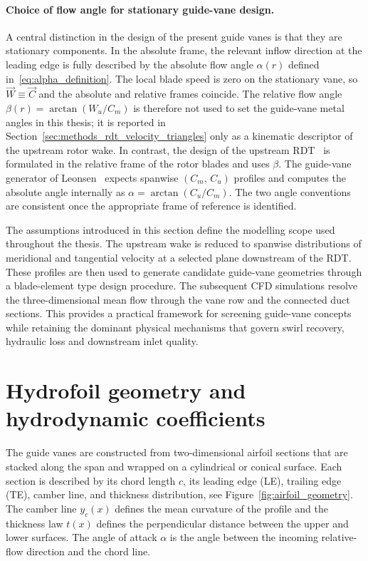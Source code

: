 \paragraph{Choice of flow angle for stationary guide-vane design.}
A central distinction in the design of the present guide vanes is that they are stationary components. In the absolute frame, the relevant inflow direction at the leading edge is fully described by the absolute flow angle $\alpha(r)$ defined in~\eqref{eq:alpha_definition}. The local blade speed is zero on the stationary vane, so $\vec{W}\equiv \vec{C}$ and the absolute and relative frames coincide. The relative flow angle $\beta(r)=\arctan(W_u/C_m)$ is therefore not used to set the guide-vane metal angles in this thesis; it is reported in Section~\ref{sec:methods_rdt_velocity_triangles} only as a kinematic descriptor of the upstream rotor wake. In contrast, the design of the upstream RDT~\cite{DjupeslandTrivedi2025} is formulated in the relative frame of the rotor blades and uses $\beta$. The guide-vane generator of Leonsen~\cite{Leonsen2025} expects spanwise $(C_m,\,C_u)$ profiles and computes the absolute angle internally as $\alpha = \arctan(C_u/C_m)$. The two angle conventions are consistent once the appropriate frame of reference is identified.

The assumptions introduced in this section define the modelling scope used throughout the thesis. The upstream wake is reduced to spanwise distributions of meridional and tangential velocity at a selected plane downstream of the RDT. These profiles are then used to generate candidate guide-vane geometries through a blade-element type design procedure. The subsequent CFD simulations resolve the three-dimensional mean flow through the vane row and the connected duct sections. This provides a practical framework for screening guide-vane concepts while retaining the dominant physical mechanisms that govern swirl recovery, hydraulic loss and downstream inlet quality.

\section{Hydrofoil geometry and hydrodynamic coefficients}
\label{sec:theory_airfoil}
 
The guide vanes are constructed from two-dimensional airfoil sections that are stacked along the span and wrapped on a cylindrical or conical surface. Each section is described by its chord length $c$, its leading edge (LE), trailing edge (TE), camber line, and thickness distribution, see Figure~\ref{fig:airfoil_geometry}. The camber line $y_c(x)$ defines the mean curvature of the profile and the thickness law $t(x)$ defines the perpendicular distance between the upper and lower surfaces. The angle of attack $\alpha$ is the angle between the incoming relative-flow direction and the chord line.
 
